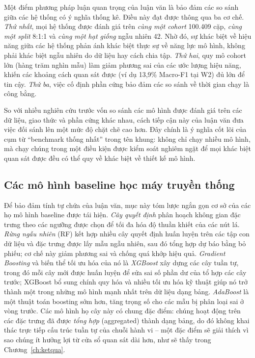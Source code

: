 Một điểm phương pháp luận quan trọng của luận văn là bảo đảm các so sánh giữa các hệ thống có ý nghĩa thống kê. Điều này đạt được thông qua ba cơ chế. \textit{Thứ nhất}, mọi hệ thống được đánh giá trên \emph{cùng một cohort} 100.409 cặp, \emph{cùng một split} 8:1:1 và \emph{cùng một hạt giống} ngẫu nhiên 42. Nhờ đó, sự khác biệt về hiệu năng giữa các hệ thống phản ánh khác biệt thực sự về năng lực mô hình, không phải khác biệt ngẫu nhiên do dữ liệu hay cách chia tập. \textit{Thứ hai}, quy mô cohort lớn (hàng trăm nghìn mẫu) làm giảm phương sai của các ước lượng hiệu năng, khiến các khoảng cách quan sát được (ví dụ 13,9\% Macro-F1 tại W2) đủ lớn để tin cậy. \textit{Thứ ba}, việc cố định phần cứng bảo đảm các so sánh về thời gian chạy là công bằng.

So với nhiều nghiên cứu trước vốn so sánh các mô hình được đánh giá trên các dữ liệu, giao thức và phần cứng khác nhau, cách tiếp cận này của luận văn đưa việc đối sánh lên một mức độ chặt chẽ cao hơn. Đây chính là ý nghĩa cốt lõi của cụm từ ``benchmark thống nhất'' trong tên khung: không chỉ chạy nhiều mô hình, mà chạy chúng trong một điều kiện được kiểm soát nghiêm ngặt để mọi khác biệt quan sát được đều có thể quy về khác biệt về thiết kế mô hình.

\subsection{Các mô hình baseline học máy truyền thống}
Để bảo đảm tính tự chứa của luận văn, mục này tóm lược ngắn gọn cơ sở của các họ mô hình baseline được tái hiện. \textit{Cây quyết định} phân hoạch không gian đặc trưng theo các ngưỡng được chọn để tối đa hóa độ thuần khiết của các nút lá. \textit{Rừng ngẫu nhiên} (RF) kết hợp nhiều cây quyết định huấn luyện trên các tập con dữ liệu và đặc trưng được lấy mẫu ngẫu nhiên, sau đó tổng hợp dự báo bằng bỏ phiếu; cơ chế này giảm phương sai và chống quá khớp hiệu quả. \textit{Gradient Boosting} và biến thể tối ưu hóa của nó là \textit{XGBoost} xây dựng các cây tuần tự, trong đó mỗi cây mới được huấn luyện để sửa sai số phần dư của tổ hợp các cây trước; XGBoost bổ sung chính quy hóa và nhiều tối ưu hóa kỹ thuật giúp nó trở thành một trong những mô hình mạnh nhất trên dữ liệu dạng bảng. \textit{AdaBoost} là một thuật toán boosting sớm hơn, tăng trọng số cho các mẫu bị phân loại sai ở vòng trước. Các mô hình họ cây này có chung đặc điểm: chúng hoạt động trên các đặc trưng đã được \emph{tổng hợp} (aggregated) thành dạng bảng, do đó không khai thác trực tiếp cấu trúc tuần tự của chuỗi hành vi -- một đặc điểm sẽ giải thích vì sao chúng ít hưởng lợi từ cửa sổ quan sát dài hơn, như sẽ thấy trong Chương~\ref{ch:ketqua}.

